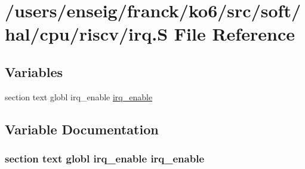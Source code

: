 \hypertarget{riscv_2irq_8S}{\section{/users/enseig/franck/ko6/src/soft/hal/cpu/riscv/irq.S File Reference}
\label{riscv_2irq_8S}
}
\subsection*{Variables}
\begin{DoxyCompactItemize}
\item 
section text globl irq\-\_\-enable \hyperlink{riscv_2irq_8S_aaef40102bb274fecd542c306bb6a8e20}{irq\-\_\-enable}
\end{DoxyCompactItemize}


\subsection{Variable Documentation}
\hypertarget{riscv_2irq_8S_aaef40102bb274fecd542c306bb6a8e20}{
\subsubsection[{irq\-\_\-enable}]{\setlength{\rightskip}{0pt plus 5cm}section text globl irq\-\_\-enable irq\-\_\-enable}}\label{riscv_2irq_8S_aaef40102bb274fecd542c306bb6a8e20}
